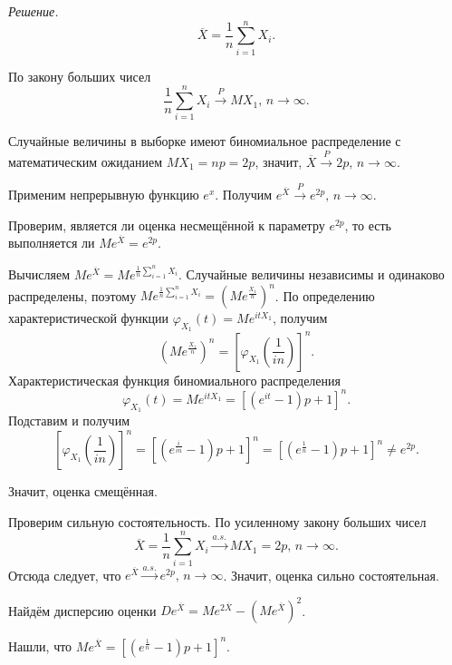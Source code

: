 \textit{Решение.}
$$ \overline{X} =
  \frac{1}{n} \sum \limits_{i = 1}^n X_i.$$

По закону больших чисел
$$ \frac{1}{n} \sum \limits_{i = 1}^n X_i \overset{P}{ \to } MX_1, \,
  n \to \infty.$$

Случайные величины в выборке имеют биномиальное распределение с математическим ожиданием
$MX_1 = np = 2p$, значит, $ \overline{X} \overset{P}{ \to } 2p, \, n \to \infty $.

Применим непрерывную функцию $e^x$.
Получим $e^{ \overline{X}} \overset{P}{ \to } e^{2p}, \, n \to \infty $.

Проверим, является ли оценка несмещённой к параметру $e^{2p}$,
то есть выполняется ли $Me^{ \overline{X}} = e^{2p}$.

Вычисляем $Me^{ \overline{X}} = Me^{ \frac{1}{n} \sum \limits_{i = 1}^n X_i}$.
Случайные величины независимы и одинаково распределены,
поэтому $Me^{ \frac{1}{n} \sum \limits_{i = 1}^n X_i} = \left( Me^{ \frac{X_1}{n}} \right)^n$.
По определению характеристической функции $ \varphi_{X_1} \left( t \right) = Me^{itX_1}$, получим
$$ \left( Me^{ \frac{X_1}{n}} \right)^n =
  \left[ \varphi_{X_1} \left( \frac{1}{in} \right) \right]^n.$$
Характеристическая функция биномиального распределения
$$ \varphi_{X_1} \left( t \right) =
  Me^{itX_1} =
  \left[ \left( e^{it} - 1 \right) p + 1 \right]^n.$$
Подставим и получим
$$ \left[ \varphi_{X_1} \left( \frac{1}{in} \right) \right]^n =
  \left[ \left( e^{\frac{i}{in}} - 1 \right) p + 1 \right]^n =
  \left[ \left( e^{ \frac{1}{n}} - 1 \right) p + 1 \right]^n \neq
  e^{2p}.$$

Значит, оценка смещённая.

Проверим сильную состоятельность.
По усиленному закону больших чисел
$$ \overline{X} = \frac{1}{n} \sum \limits_{i = 1}^n X_i \overset{a.s.}{ \to } MX_1 = 2p, \,
  n \to \infty.$$
Отсюда следует, что $e^{ \overline{X}} \overset{a.s.}{ \to } e^{2p}, \, n \to \infty $.
Значит, оценка сильно состоятельная.

Найдём дисперсию оценки
$De^{ \overline{X}} =
  Me^{2 \overline{X}} - \left( Me^{ \overline{X}} \right)^2$.

Нашли, что $Me^{ \overline{X}} = \left[ \left( e^{ \frac{1}{n}} - 1 \right) p + 1 \right]^n$.

